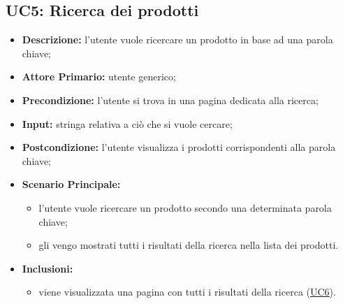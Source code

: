         \subsection{UC5: Ricerca dei prodotti}
        \label{sec:UC5}
        \begin{itemize}
            \item \textbf{Descrizione:} l'utente vuole ricercare un prodotto in base ad una parola chiave; 
            \item \textbf{Attore Primario:} utente generico;
            \item \textbf{Precondizione:} l'utente si trova in una pagina dedicata alla ricerca; 
            \item \textbf{Input:} stringa relativa a ciò che si vuole cercare;
            \item \textbf{Postcondizione:} l'utente visualizza i prodotti corrispondenti alla parola chiave;
            \item \textbf{Scenario Principale:}
            \begin{itemize}
                \item l'utente vuole ricercare un prodotto secondo una determinata parola chiave;
                \item gli vengo mostrati tutti i risultati della ricerca nella lista dei prodotti.
            \end{itemize}
            \item \textbf{Inclusioni:}
            \begin{itemize}
                \item viene visualizzata una pagina con tutti i risultati della ricerca (\hyperref[sec:UC6]{\underline{UC6}}).
            \end{itemize}
        \end{itemize}
